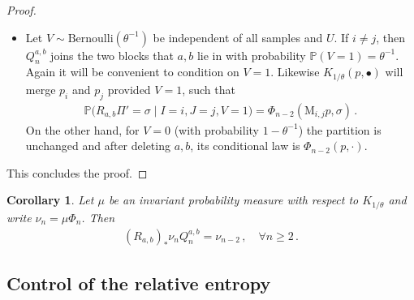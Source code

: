 \documentclass[a4paper,11pt]{article}
\newcommand{\PP}{\mathbb{P}}
\numberwithin{equation}{section}
\newtheorem{corollary}[theorem]{Corollary}
\begin{document}
\begin{proof}
\begin{itemize}
Averaging over $U=u$, will yield the required integral present in both split operations.

\item Let $V\sim\mathrm{Bernoulli}(\theta^{-1})$ be independent of all samples and $U$. If $ i\neq j$, then $ Q_{n}^{a,b}$ joins the two blocks that $ a,b$ lie in with probability $ \PP(V=1)= \theta^{-1}$. Again it will be convenient to condition on  $V=1$.
 Likewise $ K_{1/\theta}( p, \bullet)$ will merge $ p_{i}$ and $ p_{j}$ provided $V=1$, such that 
\begin{equation*}
\begin{aligned}
\mathbb P\bigl(R_{a,b}\Pi'=\sigma \mid I=i, J=j, V=1\bigr)
=
\Phi_{n-2}(\mathrm M_{i,j}p,\sigma)\,.
\end{aligned}
\end{equation*}
On the other hand, for $V=0$ (with probability $ 1- \theta^{-1}$) the partition is unchanged and after deleting $a,b$, its conditional law is $\Phi_{n-2}(p,\cdot)$.
\end{itemize}
This concludes the proof.
\end{proof}



\begin{corollary}\label{cor_intertw}
Let $ \mu$ be an invariant probability measure with respect to $ K_{1/\theta}$ and write $ \nu_{n}= \mu \Phi_{n}$. Then 
\begin{equation*}
\begin{aligned}
( R_{a,b})_{\ast}
\nu_{n} Q_{n}^{a,b}= \nu_{n-2}\,, \quad \forall n \geqslant 2\,.
\end{aligned}
\end{equation*}
\end{corollary}


\subsection{Control of the relative entropy}
\end{document}
